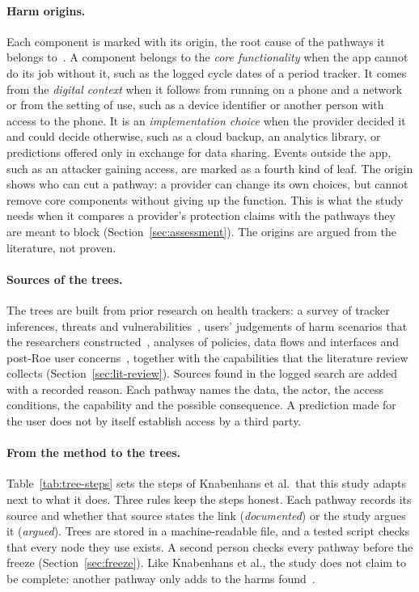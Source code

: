 \paragraph{Harm origins.} Each component is marked with its origin, the root
cause of the pathways it belongs
to~\parencite[\S4.1]{knabenhans2026harms}. A component belongs to the
\emph{core functionality} when the app cannot do its job without it, such as
the logged cycle dates of a period tracker. It comes from the \emph{digital
context} when it follows from running on a phone and a network or from the
setting of use, such as a device identifier or another person with access to
the phone. It is an \emph{implementation choice} when the provider decided it
and could decide otherwise, such as a cloud backup, an analytics library, or
predictions offered only in exchange for data sharing. Events outside the app, such as an
attacker gaining access, are marked as a fourth kind of leaf. The origin shows who
can cut a pathway: a provider can change its own choices, but cannot remove
core components without giving up the function. This is what the study needs
when it compares a provider's protection claims with the pathways they are
meant to block (Section~\ref{sec:assessment}). The origins are argued from the
literature, not proven.

\paragraph{Sources of the trees.} The trees are built from prior research on
health trackers: a survey of tracker inferences, threats and
vulnerabilities~\parencite{niksirat2024wearable}, users' judgements of harm scenarios
that the researchers constructed~\parencite{gabriele2020understanding}, analyses of policies, data
flows and interfaces
\parencite{shipp2020period,malki2024exploring,hudig2025intimate} and post-Roe
user concerns~\parencite{cao2024deleted}, together with the capabilities that
the literature review collects (Section~\ref{sec:lit-review}). Sources found in
the logged search are added with a recorded reason. Each pathway names the
data, the actor, the access conditions, the capability and the possible
consequence. A prediction made for the user does not by itself establish
access by a third party.

\paragraph{From the method to the trees.} Table~\ref{tab:tree-steps} sets the steps of
Knabenhans et al.\ that this study adapts next to what it does. Three rules keep the steps honest.
Each pathway records its source and whether that source states the link
(\emph{documented}) or the study argues it (\emph{argued}). Trees are stored in a
machine-readable file, and a tested script checks that every node they use exists.
A second person checks every pathway before the freeze (Section~\ref{sec:freeze}).
Like Knabenhans et al., the study does not claim to be complete: another pathway only
adds to the harms found~\parencite[\S4.1]{knabenhans2026harms}.

